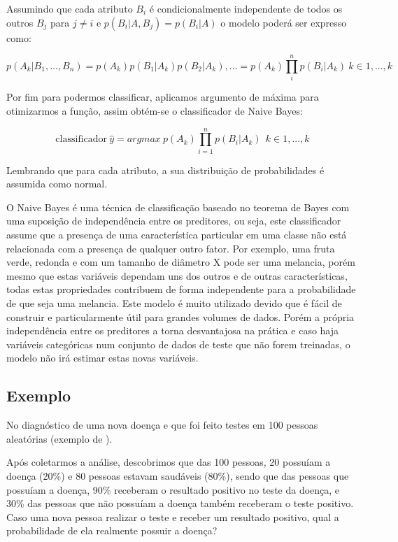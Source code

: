 \documentclass[
  openany]{book}
\begin{document}
Assumindo que cada atributo \(B_i\) é condicionalmente independente de todos os outros \(B_j\) para \(j\neq i\) e \(p(B_i|A,B_j)=p(B_i|A)\) o modelo poderá ser expresso como:

\begin{equation} 
  p(A_k|B_1,...,B_n)=p(A_k)p(B_1|A_k)p(B_2|A_k),...=p(A_k)\prod_i^n p(B_i|A_k) \ k ∈{1,...,k}
  \label{eq:bayesprodutorio}
\end{equation}

Por fim para podermos classificar, aplicamos argumento de máxima para otimizarmos a função, assim obtém-se o classificador de Naive Bayes:

\begin{equation} 
  \mbox{classificador} \ \hat{y}=argmax \ p(A_k)\displaystyle \prod_{i=1}^n p(B_i|A_k) \ \ k ∈{1,...,k}
  \label{eq:naivebayes}
\end{equation}

Lembrando que para cada atributo, a sua distribuição de probabilidades é assumida como normal.

O Naive Bayes é uma técnica de classificação baseado no teorema de Bayes com uma suposição de independência entre os preditores, ou seja, este classificador assume que a presença de uma característica particular em uma classe não está relacionada com a presença de qualquer outro fator. Por exemplo, uma fruta verde, redonda e com um tamanho de diâmetro X pode ser uma melancia, porém mesmo que estas variáveis dependam uns dos outros e de outras características, todas estas propriedades contribuem de forma independente para a probabilidade de que seja uma melancia. Este modelo é muito utilizado devido que é fácil de construir e particularmente útil para grandes volumes de dados. Porém a própria independência entre os preditores a torna desvantajosa na prática e caso haja variáveis categóricas num conjunto de dados de teste que não forem treinadas, o modelo não irá estimar estas novas variáveis.

\hypertarget{exbayes}{%
\subsection{Exemplo}\label{exbayes}}

No diagnóstico de uma nova doença e que foi feito testes em 100 pessoas aleatórias (exemplo de \citet{organica}).

Após coletarmos a análise, descobrimos que das 100 pessoas, 20 possuíam a doença (20\%) e 80 pessoas estavam saudáveis (80\%), sendo que das pessoas que possuíam a doença, 90\% receberam o resultado positivo no teste da doença, e 30\% das pessoas que não possuíam a doença também receberam o teste positivo. Caso uma nova pessoa realizar o teste e receber um resultado positivo, qual a probabilidade de ela realmente possuir a doença?
\end{document}
